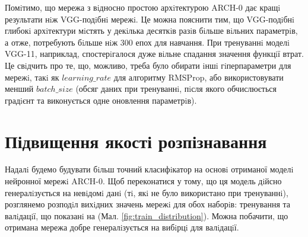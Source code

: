 Помiтимо, що мережа з вiдносно простою архiтектурою ARCH-0 дає кращi результати нiж VGG-подiбнi мережi. Це можна пояснити тим, що VGG-подiбнi глибокi архiтектури мiстять у декiлька десяткiв разiв бiльше вiльних параметрiв, а отже, потребують бiльше нiж 300 епох для навчання. При тренуваннi моделi VGG-11, наприклад, спостерiгалося дуже вiльне спадання значення функцiї втрат. Це свiдчить про те, що, можливо, треба було обирати iншi гiперпараметри для мережi, такi як \(learning\_ rate\) для алгоритму RMSProp, або використовувати менший \(batch\_size\) (обсяг даних при тренуваннi, пiсля якого обчислюється градiєнт та виконується одне оновлення параметрiв).

\section{Підвищення якості розпізнавання}

Надалi будемо будувати бiльш точний класифiкатор на основi отриманої моделi нейронної мережi ARCH-0. Щоб переконатися у тому, що ця модель дiйсно генералiзується на невiдомi данi (тi, якi не було використано при тренуваннi), розглянемо розподiл вихiдних значень мережi для обох наборiв: тренування та валiдацiї, що показанi на (Мал. \ref{fig:train_distribution}). Можна побачити, що отримана мережа добре генералiзується на вибiрцi для валiдацiї.

